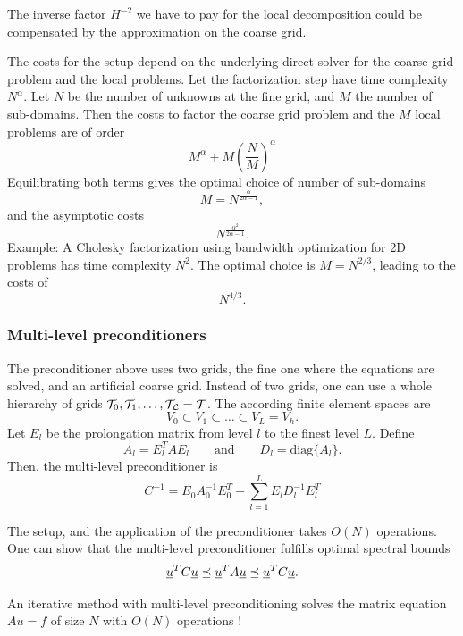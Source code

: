 The inverse factor $H^{-2}$ we have to pay for the local decomposition could 
be compensated by the approximation on the coarse grid. 

\bigskip
The costs for the setup depend on the underlying direct solver for the coarse
grid problem and the local problems. Let the factorization step have time
complexity $N^\alpha$. Let $N$ be the number of unknowns at the fine grid,
and $M$ the number of sub-domains. Then the costs to factor the coarse grid
problem and the $M$ local problems are  of order
$$
M^\alpha + M \left( \frac{N}{M} \right)^\alpha
$$
Equilibrating both terms gives the optimal choice of number of sub-domains
$$
M = N^\frac{\alpha}{2 \alpha-1},
$$
and the asymptotic costs
$$
N^\frac{\alpha^2}{2 \alpha-1}.
$$
Example: A Cholesky factorization using bandwidth optimization for 2D problems
has time complexity $N^2$. The optimal choice is $M = N^{2/3}$, leading to
the costs of 
$$
N^{4/3}.
$$

\bigskip

\subsubsection{Multi-level preconditioners}
The preconditioner above uses two grids, the fine one where the equations
are solved, and an artificial coarse grid. Instead of two grids, one
can use a whole hierarchy of grids ${\cal T}_0, {\cal T}_1, \ldots , {\cal T_L} = {\cal T}$. The according finite element spaces are
$$
V_0 \subset V_1 \subset \ldots \subset V_L = V_h.
$$
Let $E_l$ be the prolongation matrix from level $l$ to the finest level $L$.
Define
$$
A_l = E_l^T A E_l \qquad \mbox{and} \qquad D_l = \mbox{diag} \{ A_l \}.
$$
Then, the multi-level preconditioner is
$$
C^{-1} = E_0 A_0^{-1} E_0^T + \sum_{l=1}^L E_l D_l^{-1} E_l^T
$$

The setup, and the application of the preconditioner takes
$O(N)$ operations. One can show that the multi-level preconditioner
fulfills optimal spectral bounds
$$
\underline u^T  C \underline u \preceq \underline u^T A \underline u \preceq \underline u^T C \underline u.
$$

An iterative method with multi-level preconditioning solves the
matrix equation $A u = f$ of size $N$ with $O(N)$ operations !



